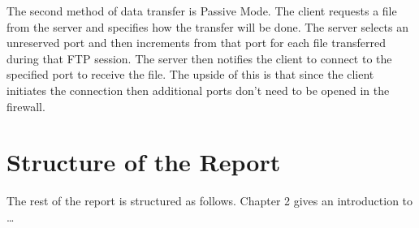 The second method of data transfer is Passive Mode. The client requests a file from the server and specifies how the transfer will be done. The server selects an unreserved port
and then increments from that port for each file transferred during that FTP session. The server then notifies the client to connect to the specified port to receive the file. The
upside of this is that since the client initiates the connection then additional ports don't need to be opened in the firewall.

\section{Structure of the Report}
The rest of the report is structured as follows. Chapter 2 gives an introduction to \ldots
